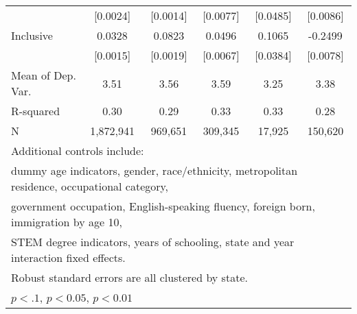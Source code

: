 \begin{table}[htbp]
\begin{tabular}{l*{5}{c}}
                    &    [0.0024]         &    [0.0014]         &    [0.0077]         &    [0.0485]         &    [0.0086]         \\
\addlinespace
Inclusive           &      0.0328\sym{***}&      0.0823\sym{***}&      0.0496\sym{***}&      0.1065\sym{***}&     -0.2499\sym{***}\\
                    &    [0.0015]         &    [0.0019]         &    [0.0067]         &    [0.0384]         &    [0.0078]         \\
\midrule
Mean of Dep. Var.   &        3.51         &        3.56         &        3.59         &        3.25         &        3.38         \\
R-squared           &        0.30         &        0.29         &        0.33         &        0.33         &        0.28         \\
N                   &   1,872,941         &     969,651         &     309,345         &      17,925         &     150,620         \\
\bottomrule
\multicolumn{6}{l}{\footnotesize Additional controls include:}\\
\multicolumn{6}{l}{\footnotesize dummy age indicators, gender, race/ethnicity, metropolitan residence, occupational category,}\\
\multicolumn{6}{l}{\footnotesize government occupation, English-speaking fluency, foreign born, immigration by age 10,}\\
\multicolumn{6}{l}{\footnotesize STEM degree indicators, years of schooling, state and year interaction fixed effects.}\\
\multicolumn{6}{l}{\footnotesize Robust standard errors are all clustered by state.}\\
\multicolumn{6}{l}{\footnotesize \sym{*} \(p<.1\), \sym{**} \(p<0.05\), \sym{***} \(p<0.01\)}\\
\end{tabular}
\end{table}
